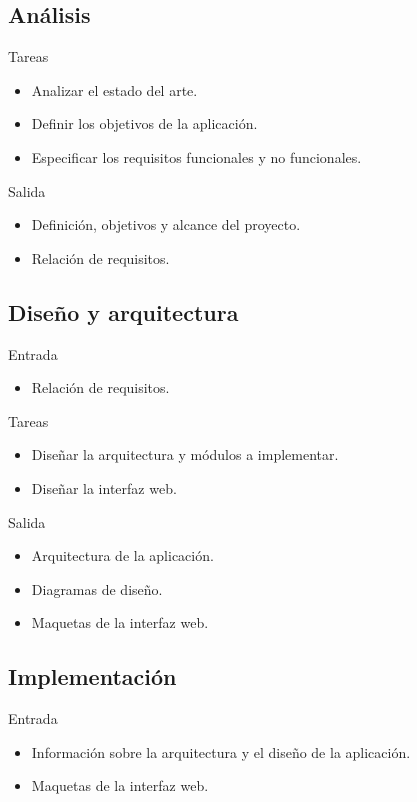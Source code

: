 \subsection*{Análisis\label{ssec:dp:analisis}}

Tareas
\begin{itemize}[leftmargin=3.5em]
  \item Analizar el estado del arte.
  \item Definir los objetivos de la aplicación.
  \item Especificar los requisitos funcionales y no funcionales.
\end{itemize}

Salida
\begin{itemize}[leftmargin=3.5em]
  \item Definición, objetivos y alcance del proyecto.
  \item Relación de requisitos.
\end{itemize}

\subsection*{Diseño y arquitectura\label{ssec:dp:disenho}}

Entrada
\begin{itemize}[leftmargin=3.5em]
  \item Relación de requisitos.
\end{itemize}

Tareas
\begin{itemize}[leftmargin=3.5em]
  \item Diseñar la arquitectura y módulos a implementar. 
  \item Diseñar la interfaz web.
\end{itemize}

Salida
\begin{itemize}[leftmargin=3.5em]
  \item Arquitectura de la aplicación.
  \item Diagramas de diseño.
  \item Maquetas de la interfaz web.
\end{itemize}

\subsection*{Implementación\label{ssec:dp:implementacion}}

Entrada
\begin{itemize}[leftmargin=3.5em]
  \item Información sobre la arquitectura y el diseño de la aplicación.
  \item Maquetas de la interfaz web.
\end{itemize}

